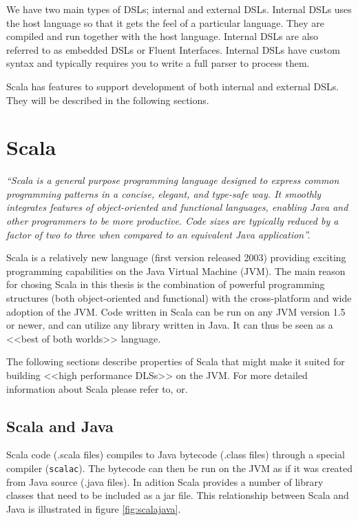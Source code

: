 \documentclass[a4paper,english]{report}
\begin{document}
We have two main types of DSLs; internal and external DSLs. Internal
DSLs uses the host language so that it gets the feel of a particular
language. They are compiled and run together with the host
language. Internal DSLs are also referred to as embedded DSLs or
Fluent Interfaces. Internal DSLs have custom syntax and typically
requires you to write a full parser to process them.

Scala has features to support development of both internal and
external DSLs. They will be described in the following sections.

\chapter{Scala}

\textit{``Scala is a general purpose programming language designed to
  express common programming patterns in a concise, elegant, and
  type-safe way. It smoothly integrates features of object-oriented
  and functional languages, enabling Java and other programmers to be
  more productive. Code sizes are typically reduced by a factor of two
  to three when compared to an equivalent Java
  application''.}\cite{scala}

Scala is a relatively new language (first version released
2003\cite{scala}) providing exciting programming capabilities on the
Java Virtual Machine (JVM). The main reason for chosing Scala in this
thesis is the combination of powerful programming structures (both
object-oriented and functional) with the cross-platform and wide
adoption of the JVM. Code written in Scala can be run on any JVM
version 1.5 or newer, and can utilize any library written in Java. It
can thus be seen as a <<best of both worlds>> language.

The following sections describe properties of Scala that might make it
suited for building <<high performance DLSs>> on the JVM. For more
detailed information about Scala please refer
to\cite{ode08},\cite{scala} or\cite{scalatour}.

\section{Scala and Java}

Scala code (.scala files) compiles to Java bytecode (.class files)
through a special compiler (\texttt{scalac}). The bytecode can then be
run on the JVM as if it was created from Java source (.java files). In
adition Scala provides a number of library classes that need to be
included as a jar file. This relationship between Scala and Java is
illustrated in figure \vref{fig:scalajava}.
\end{document}
